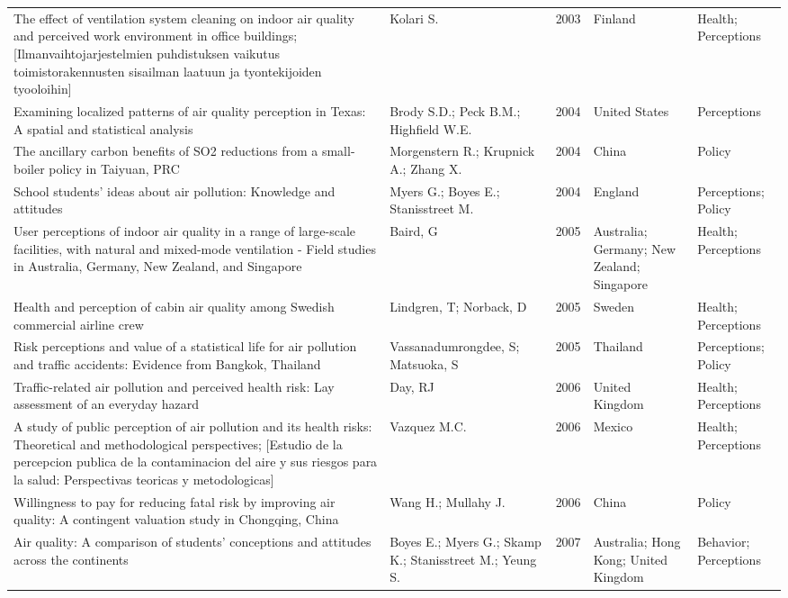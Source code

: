 {\begin{longtable}[t]{p{6cm}p{3cm}lp{3cm}p{3cm}}
The effect of ventilation system cleaning on indoor air quality and perceived work environment in office buildings; [Ilmanvaihtojarjestelmien puhdistuksen vaikutus toimistorakennusten sisailman laatuun ja tyontekijoiden tyooloihin] & Kolari S. & 2003 & Finland & Health; Perceptions\\
Examining localized patterns of air quality perception in Texas: A spatial and statistical analysis & Brody S.D.; Peck B.M.; Highfield W.E. & 2004 & United States & Perceptions\\
\addlinespace
The ancillary carbon benefits of SO2 reductions from a small-boiler policy in Taiyuan, PRC & Morgenstern R.; Krupnick A.; Zhang X. & 2004 & China & Policy\\
School students' ideas about air pollution: Knowledge and attitudes & Myers G.; Boyes E.; Stanisstreet M. & 2004 & England & Perceptions; Policy\\
User perceptions of indoor air quality in a range of large-scale facilities, with natural and mixed-mode ventilation - Field studies in Australia, Germany, New Zealand, and Singapore & Baird, G & 2005 & Australia; Germany; New Zealand; Singapore & Health; Perceptions\\
Health and perception of cabin air quality among Swedish commercial airline crew & Lindgren, T; Norback, D & 2005 & Sweden & Health; Perceptions\\
Risk perceptions and value of a statistical life for air pollution and traffic accidents: Evidence from Bangkok, Thailand & Vassanadumrongdee, S; Matsuoka, S & 2005 & Thailand & Perceptions; Policy\\
\addlinespace
Traffic-related air pollution and perceived health risk: Lay assessment of an everyday hazard & Day, RJ & 2006 & United Kingdom & Health; Perceptions\\
A study of public perception of air pollution and its health risks: Theoretical and methodological perspectives; [Estudio de la percepcion publica de la contaminacion del aire y sus riesgos para la salud: Perspectivas teoricas y metodologicas] & Vazquez M.C. & 2006 & Mexico & Health; Perceptions\\
Willingness to pay for reducing fatal risk by improving air quality: A contingent valuation study in Chongqing, China & Wang H.; Mullahy J. & 2006 & China & Policy\\
Air quality: A comparison of students' conceptions and attitudes across the continents & Boyes E.; Myers G.; Skamp K.; Stanisstreet M.; Yeung S. & 2007 & Australia; Hong Kong; United Kingdom & Behavior; Perceptions\\

\end{longtable}}
